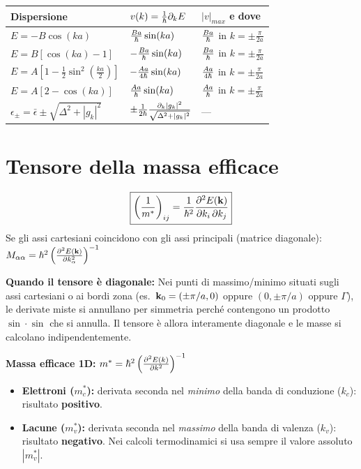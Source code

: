 \begin{center}
\renewcommand{\arraystretch}{1.6}
\begin{tabular}{l l l}
\toprule
Dispersione & $v(k)=\frac1{\hbar}\partial_kE$ & $|v|_{max}$ e dove \\
\midrule
$E = -B\cos(ka)$ & $\frac{Ba}{\hbar}\sin(ka)$ & $\frac{Ba}{\hbar}$ in $k=\pm\frac{\pi}{2a}$ \\
$E = B\left[\cos(ka)-1\right]$ & $-\frac{Ba}{\hbar}\sin(ka)$ & $\frac{Ba}{\hbar}$ in $k=\pm\frac{\pi}{2a}$ \\
$E = A\left[1-\frac12\sin^2\!\left(\frac{ka}{2}\right)\right]$ & $-\frac{Aa}{4\hbar}\sin(ka)$ & $\frac{Aa}{4\hbar}$ in $k=\pm\frac{\pi}{2a}$ \\
$E = A\left[2-\cos(ka)\right]$ & $\frac{Aa}{\hbar}\sin(ka)$ & $\frac{Aa}{\hbar}$ in $k=\pm\frac{\pi}{2a}$ \\
$\epsilon_\pm=\bar\epsilon\pm\sqrt{\Delta^2+|g_k|^2}$ & $\pm\frac{1}{2\hbar}\frac{\partial_k|g_k|^2}{\sqrt{\Delta^2+|g_k|^2}}$ & --- \\
\bottomrule
\end{tabular}
\end{center}

\section{Tensore della massa efficace}
\[ \boxed{\left(\frac{1}{m^*}\right)_{ij} = \frac{1}{\hbar^2}\frac{\partial^2 E(\mathbf{k})}{\partial k_i\,\partial k_j}} \]
Se gli assi cartesiani coincidono con gli assi principali (matrice diagonale): $ M_{\alpha\alpha} = \hbar^2\left(\frac{\partial^2 E(\mathbf{k})}{\partial k_\alpha^2}\right)^{-1}$

\noindent\textbf{Quando il tensore è diagonale:} Nei punti di massimo/minimo situati sugli assi cartesiani o ai bordi zona (es.\ $\mathbf{k}_0=(\pm\pi/a,0)$ oppure $(0,\pm\pi/a)$ oppure $\Gamma$), le derivate miste si annullano per simmetria perché contengono un prodotto $\sin\cdot\sin$ che si annulla. Il tensore è allora interamente diagonale e le masse si calcolano indipendentemente.

\vspace{0.3cm}
\noindent\textbf{Massa efficace 1D:} $ m^* = \hbar^2\left(\frac{\partial^2E(k)}{\partial k^2}\right)^{-1} $
\begin{itemize}
    \item \textbf{Elettroni ($m_c^*$):} derivata seconda nel \emph{minimo} della banda di conduzione ($k_c$): risultato \textbf{positivo}.
    \item \textbf{Lacune ($m_v^*$):} derivata seconda nel \emph{massimo} della banda di valenza ($k_v$): risultato \textbf{negativo}. Nei calcoli termodinamici si usa sempre il valore assoluto $|m_v^*|$.
\end{itemize}


